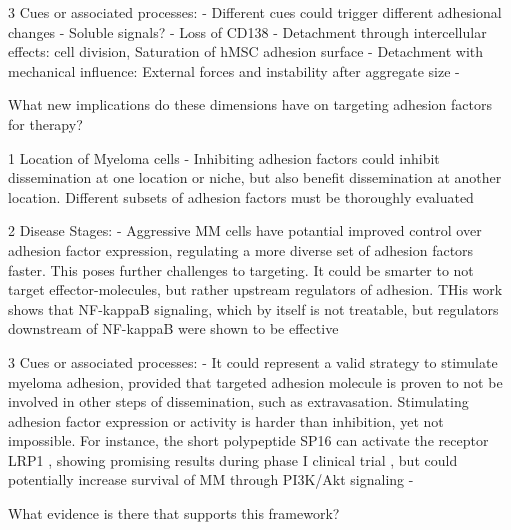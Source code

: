 3 Cues or associated processes:
- Different cues could trigger different adhesional changes
- Soluble signals?
- Loss of CD138 \cite{akhmetzyanovaDynamicCD138Surface2020}
- Detachment through intercellular effects: cell division, Saturation of hMSC adhesion surface
- Detachment with mechanical influence: External forces and instability after aggregate size
-


What new implications do these dimensions have on targeting adhesion factors for
therapy?

1 Location of Myeloma cells
- Inhibiting adhesion factors could inhibit dissemination at one location
or niche, but also benefit dissemination at another location. Different subsets
of  adhesion factors must be thoroughly evaluated


2 Disease Stages:
- Aggressive MM cells have potantial improved control over adhesion factor expression,
regulating a more diverse set of adhesion factors faster. This poses further challenges to targeting.
It could be smarter to not target effector-molecules, but rather upstream regulators of adhesion.
THis work shows that NF-kappaB signaling, which by itself is not treatable, but regulators
downstream of NF-kappaB were shown to be effective \cite{adamikEZH2HDAC1Inhibition2017,adamikXRK3F2InhibitionP62ZZ2018}

3 Cues or associated processes:
- It could represent a valid strategy to
stimulate myeloma adhesion, provided that targeted adhesion molecule is proven
to not be involved in other steps of dissemination, such as extravasation.
Stimulating adhesion factor expression or activity is harder than inhibition,
yet not impossible. For instance, the short polypeptide SP16 can activate the
receptor LRP1 , showing promising results during phase I
clinical trial \cite{wohlfordPhaseClinicalTrial2021}, but could potentially
increase survival of MM through PI3K/Akt signaling
\cite{potereDevelopingLRP1Agonists2019, heinemannInhibitingPI3KAKT2022} -







What evidence is there that supports this framework?





